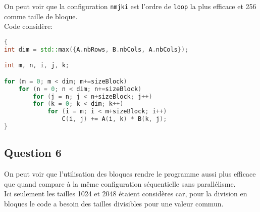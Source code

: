 \documentclass{article}
\begin{document}
\begin{resolution}
    \begin{center}
        \begin{minipage}[b]{0.3\textwidth}
        \end{minipage}
        \begin{minipage}[b]{0.3\textwidth}
        \end{minipage}
        \begin{minipage}[b]{0.3\textwidth}
        \end{minipage}
    \end{center}

    On peut voir que la configuration \texttt{nmjki} est l'ordre de \texttt{loop} la plus efficace et 256 comme taille de bloque.\\

    Code considère:
    \begin{scriptsize}
        \mycode
        \begin{lstlisting}[language=C++]
{
int dim = std::max({A.nbRows, B.nbCols, A.nbCols});

int m, n, i, j, k;

for (m = 0; m < dim; m+=sizeBlock)
    for (n = 0; n < dim; n+=sizeBlock)
        for (j = n; j < n+sizeBlock; j++)
        for (k = 0; k < dim; k++)
            for (i = m; i < m+sizeBlock; i++)
                C(i, j) += A(i, k) * B(k, j);
}
        \end{lstlisting}
    \end{scriptsize}
\end{resolution}

\newpage\subsection*{Question 6}
\begin{resolution}
    On peut voir que l'utilisation des bloques rendre le programme aussi plus efficace que quand compare à la même configuration séquentielle sans parallélisme.\\

    Ici seulement les tailles 1024 et 2048 étaient considères car, pour la division en bloques le code a besoin des tailles divisibles pour une valeur commun.
\end{resolution}
\end{document}
